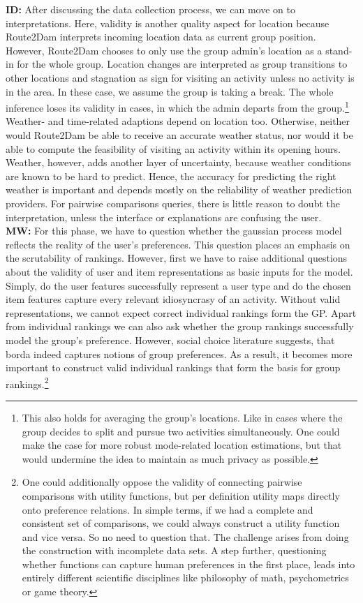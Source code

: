 \documentclass[11pt,a4paper,oneside]{article}
\begin{document}
\textbf{ID:} After discussing the data collection process, we can move on to interpretations. Here, validity is another quality aspect for location because Route2Dam interprets incoming location data as current group position. However, Route2Dam chooses to only use the group admin's location as a stand-in for the whole group. Location changes are interpreted as group transitions to other locations and stagnation as sign for visiting an activity unless no activity is in the area. In these case, we assume the group is taking a break. The whole inference loses its validity in cases, in which the admin departs from the group.\footnote{This also holds for averaging the group's locations. Like in cases where the group decides to split and pursue two activities simultaneously. One could make the case for more robust mode-related location estimations, but that would undermine the idea to maintain as much privacy as possible.} Weather- and time-related adaptions depend on location too. Otherwise, neither would Route2Dam be able to receive an accurate weather status, nor would it be able to compute the feasibility of visiting an activity within its opening hours. Weather, however, adds another layer of uncertainty, because weather conditions are known to be hard to predict. Hence, the accuracy for predicting the right weather is important and depends mostly on the reliability of weather prediction providers. For pairwise comparisons queries, there is little reason to doubt the interpretation, unless the interface or explanations are confusing the user. \\
\textbf{MW:} For this phase, we have to question whether the gaussian process model reflects the reality of the user's preferences. This question places an emphasis on the scrutability of rankings. However, first we have to raise additional questions about the validity of user and item representations as basic inputs for the model. Simply, do the user features successfully represent a user type and do the chosen item features capture every relevant idiosyncrasy of an activity. Without valid representations, we cannot expect correct individual rankings form the GP. Apart from individual rankings we can also ask whether the group rankings successfully model the group's preference. However, social choice literature suggests, that borda indeed captures notions of group preferences.\cite{CITE} As a result, it becomes more important to construct valid individual rankings that form the basis for group rankings.\footnote{One could additionally oppose the validity of connecting pairwise comparisons with utility functions, but per definition utility maps directly onto preference relations.\cite{CITE} In simple terms, if we had a complete and consistent set of comparisons, we could always construct a utility function and vice versa. So no need to question that. The challenge arises from doing the construction with incomplete data sets. A step further, questioning whether functions can capture human preferences in the first place, leads into entirely different scientific disciplines like philosophy of math, psychometrics or game theory.}\\  
\end{document}
